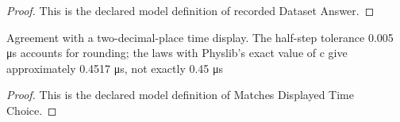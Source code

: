 \begin{proof}
  This is the declared model definition of recorded Dataset Answer.
\end{proof}
\begin{definition}
  \label{def:physics:phyx-mini-0552:phyxminiproblems-problemphyxmini0552-matchesdisplayedtimechoice}
  Agreement with a two-decimal-place time display. The half-step tolerance 0.005 μs accounts for rounding; the laws with Physlib's exact value of c give approximately 0.4517 μs, not exactly 0.45 μs
\end{definition}
\begin{proof}
  This is the declared model definition of Matches Displayed Time Choice.
\end{proof}
